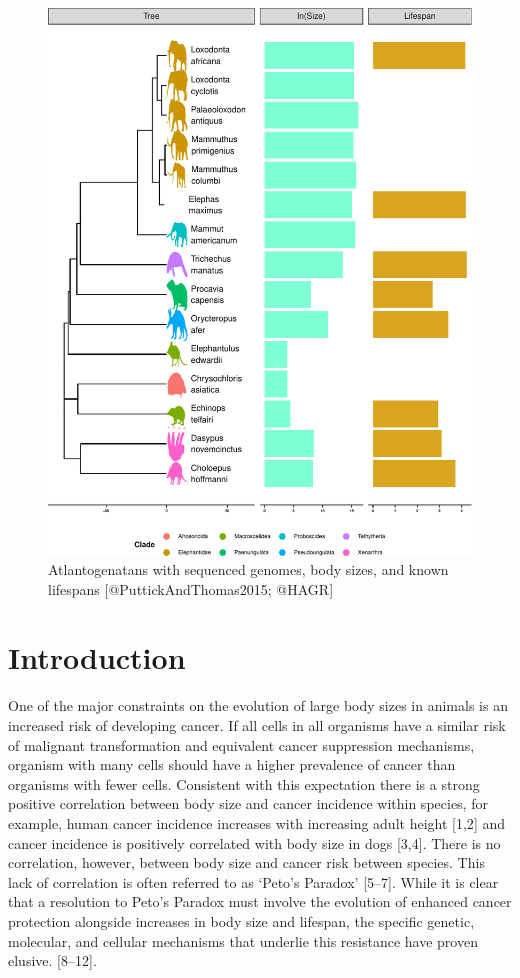 \documentclass[]{elsarticle} %
\begin{document}
\begin{figure}

\includegraphics[width=6in]{paper_PLOS_draft_files/figure-latex/Figure0-1} \hfill{}

\caption{Atlantogenatans with sequenced genomes, body sizes, and known lifespans [@PuttickAndThomas2015; @HAGR]}\label{fig:Figure0}
\end{figure}

\hypertarget{introduction}{%
\section{Introduction}\label{introduction}}

One of the major constraints on the evolution of large body sizes in
animals is an increased risk of developing cancer. If all cells in all
organisms have a similar risk of malignant transformation and equivalent
cancer suppression mechanisms, organism with many cells should have a
higher prevalence of cancer than organisms with fewer cells. Consistent
with this expectation there is a strong positive correlation between
body size and cancer incidence within species, for example, human cancer
incidence increases with increasing adult height {[}1,2{]} and cancer
incidence is positively correlated with body size in dogs {[}3,4{]}.
There is no correlation, however, between body size and cancer risk
between species. This lack of correlation is often referred to as
`Peto's Paradox' {[}5--7{]}. While it is clear that a resolution to
Peto's Paradox must involve the evolution of enhanced cancer protection
alongside increases in body size and lifespan, the specific genetic,
molecular, and cellular mechanisms that underlie this resistance have
proven elusive. {[}8--12{]}.
\end{document}
